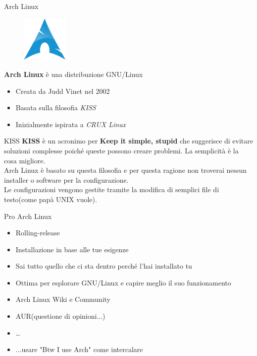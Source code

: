 \begin{frame}{Arch Linux}
    \begin{figure}[h]
        \includegraphics[width=0.2\textwidth]{images/Archlinux-icon-crystal-64.png}
    \end{figure}
    \textbf{Arch Linux} è una distribuzione GNU/Linux\\

    \begin{itemize}
        \item Creata da Judd Vinet nel 2002
        \item Basata sulla filosofia \textit{KISS}
        \item Inizialmente ispirata a \textit{CRUX Linux}
    \end{itemize}
\end{frame}


\begin{frame}{KISS}
    \textbf{KISS} è un acronimo per \textbf{Keep it simple, stupid} che suggerisce di evitare soluzioni  complesse
    poiché queste possono creare problemi. La semplicità è la cosa migliore.\\

    Arch Linux è basato su questa filosofia e per questa ragione non troverai nessun installer o software per la configurazione.\\
    Le configurazioni vengono gestite tramite la modifica di semplici file di testo(come papà UNIX vuole).
\end{frame}


\begin{frame}{Pro Arch Linux}
    \begin{itemize}
        \item Rolling-release
        \item Installazione in base alle tue esigenze
        \item Sai tutto quello che ci sta dentro perché l'hai installato tu
        \item Ottima per esplorare GNU/Linux e capire meglio il suo funzionamento
        \item Arch Linux Wiki e Community
        \item AUR(questione di opinioni...)
        \item \dots
        \item ...usare "Btw I use Arch" come intercalare
    \end{itemize}

\end{frame}


